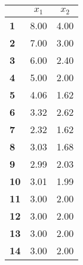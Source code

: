 \begin{small}\begin{tabular}{|l|c|c|}
\hline
&\textbf{$x_1$}&\textbf{$x_2$}\\\hline
\textbf{1}&8.00&4.00\\\hline
\textbf{2}&7.00&3.00\\\hline
\textbf{3}&6.00&2.40\\\hline
\textbf{4}&5.00&2.00\\\hline
\textbf{5}&4.06&1.62\\\hline
\textbf{6}&3.32&2.62\\\hline
\textbf{7}&2.32&1.62\\\hline
\textbf{8}&3.03&1.68\\\hline
\textbf{9}&2.99&2.03\\\hline
\textbf{10}&3.01&1.99\\\hline
\textbf{11}&3.00&2.00\\\hline
\textbf{12}&3.00&2.00\\\hline
\textbf{13}&3.00&2.00\\\hline
\textbf{14}&3.00&2.00\\\hline
\end{tabular}
\end{small}